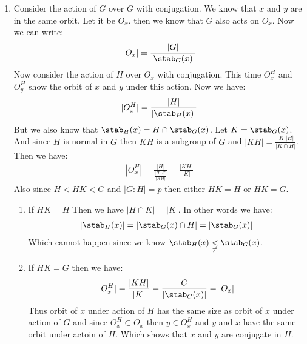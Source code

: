 \begin{enumerate}[label=]
    \item 
        Consider the action of $G$ over $G$ with conjugation. We know that $x$ and $y$ are in the same orbit. Let it be $O_x$. then we know that $G$ also acts on $O_x$.
        Now we can write:
        \begin{gather*}
            |O_x| = \frac{|G| }{|\stab_G(x)|}
        \end{gather*}
        Now consider the action of $H$ over $O_x$ with conjugation. This time $O_x^H$ and $O_y^H$ show the orbit of $x$ and $y$ under this action. Now we have:
        \begin{gather*}
            |O_x^H| = \frac{|H| }{|\stab_H(x)|}
        \end{gather*}
        But we also know that $\stab_H(x) = H \cap \stab_G(x)$. Let $K = \stab_G(x)$. And since $H$ is normal in $G$ then $KH$ is a subgroup of $G$ and $|KH| = \frac{|K||H| }{|K \cap H|}$. Then we have:
        \begin{gather*}
            |O_x^H| = \frac{|H| }{\frac{|H| |K| }{|KH|}} = \frac{|KH| }{|K|}
        \end{gather*}
        Also since $H < HK < G$ and $|G : H| = p$ then either $HK = H$ or $HK = G$.
        \begin{enumerate}
            \item
            If $HK = H$ Then we have $|H \cap K| = |K|$. In other words we have:
            \begin{gather*}
                |\stab_H(x)| = |\stab_G(x) \cap H| = |\stab_G(x)|
            \end{gather*}
            Which cannot happen since we know $\stab_H(x) \underset{\ne }{<} \stab_G(x)$.
            \item 
            If $HK = G$ then we have:
            \begin{gather*}
                |O_x^H| = \frac{|KH| }{|K|} = \frac{|G| }{|\stab_G(x)|} = |O_x|
            \end{gather*}
            Thus orbit of $x$ under action of $H$ has the same size as orbit of $x$ under action of $G$ and since $O_x^H \subset O_x$ then $y \in O_x^H$ and $y$ and $x$ have the same orbit under actoin of $H$. Which shows that $x$ and $y$ are conjugate in $H$.
        \end{enumerate}
\end{enumerate}